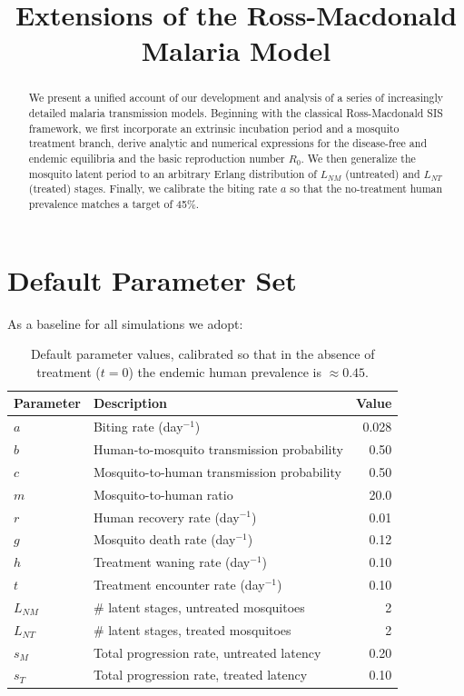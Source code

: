 \documentclass[11pt]{article}
\title{Extensions of the Ross-Macdonald Malaria Model}
\author{}
\date{}
\begin{document}
\maketitle

\begin{abstract}
We present a unified account of our development and analysis of a series of increasingly detailed malaria transmission models. Beginning with the classical Ross-Macdonald SIS framework, we first incorporate an extrinsic incubation period and a mosquito treatment branch, derive analytic and numerical expressions for the disease-free and endemic equilibria and the basic reproduction number $R_0$. We then generalize the mosquito latent period to an arbitrary Erlang distribution of $L_{NM}$ (untreated) and $L_{NT}$ (treated) stages. Finally, we calibrate the biting rate $a$ so that the no-treatment human prevalence matches a target of 45\%.  
\end{abstract}

\section*{Default Parameter Set}
As a baseline for all simulations we adopt:
\begin{table}[H]
  \centering
  \begin{tabular}{llr}
    \toprule
    Parameter & Description & Value \\
    \midrule
    $a$          & Biting rate (day$^{-1}$)                     & 0.028   \\
    $b$          & Human-to-mosquito transmission probability    & 0.50    \\
    $c$          & Mosquito-to-human transmission probability    & 0.50    \\
    $m$          & Mosquito-to-human ratio                       & 20.0    \\
    $r$          & Human recovery rate (day$^{-1}$)             & 0.01    \\
    $g$          & Mosquito death rate (day$^{-1}$)             & 0.12    \\
    $h$          & Treatment waning rate (day$^{-1}$)           & 0.10    \\
    $t$          & Treatment encounter rate (day$^{-1}$)        & 0.10    \\
    $L_{NM}$     & \# latent stages, untreated mosquitoes        & 2       \\
    $L_{NT}$     & \# latent stages, treated mosquitoes          & 2       \\
    $s_M$        & Total progression rate, untreated latency     & 0.20    \\
    $s_T$        & Total progression rate, treated latency       & 0.10    \\
    \bottomrule
  \end{tabular}
  \caption{Default parameter values, calibrated so that in the absence of treatment ($t=0$) the endemic human prevalence is $\approx0.45$.}
\end{table}
\end{document}
